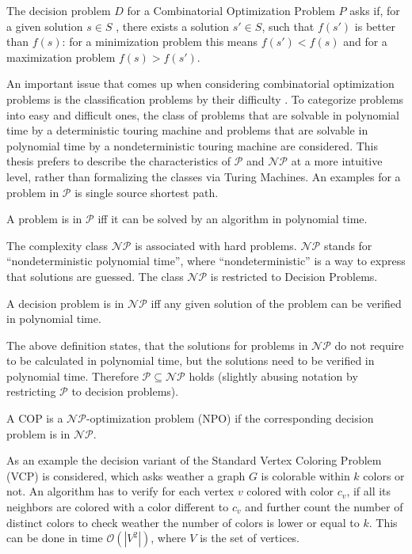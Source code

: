 \begin{definition}
The decision problem $D$ for a Combinatorial Optimization Problem $P$ asks if, for a given solution $s \in S$ , there exists a solution $s' \in S$, such that $f(s')$ is better than $f(s)$: for a minimization problem this means $f(s') < f(s)$ and for a maximization problem $f(s) > f (s')$.
\end{definition}
An important issue that comes up when considering combinatorial optimization problems is the classification problems by their difficulty . To categorize problems into easy and difficult ones, the class of problems that are solvable in polynomial time by a deterministic touring machine and problems that are solvable in polynomial time by a nondeterministic touring machine are considered. This thesis prefers to describe the characteristics of $\mathcal{P}$ and $\mathcal{NP}$ at a more intuitive level, rather than formalizing the classes via Turing Machines. An examples for a problem in $\mathcal{P}$ is single source shortest path.
\begin{definition}
A problem is in $\mathcal{P}$ iff it can be solved by an algorithm in polynomial time.
\end{definition}
The complexity class $\mathcal{NP}$ is associated with hard problems. $\mathcal{NP}$ stands for ``nondeterministic polynomial time'', where ``nondeterministic'' is a way to express that solutions are guessed. The class $\mathcal{NP}$ is restricted to Decision Problems.
\begin{definition}
A decision problem is in $\mathcal{NP}$ iff any given solution of the problem can be verified in polynomial time.
\end{definition}
The above definition states, that the solutions for problems in $\mathcal{NP}$ do not require to be calculated in polynomial time, but the solutions need to be verified in polynomial time. Therefore $\mathcal{P} \subseteq \mathcal{NP}$ holds (slightly abusing notation by restricting $\mathcal{P}$ to decision problems)\cite{neumann-10}.
\begin{definition}
A COP is a $\mathcal{NP}$-optimization problem (NPO) if the corresponding decision problem is in $\mathcal{NP}$.
\end{definition}
As an example the decision variant of the Standard Vertex Coloring Problem (VCP) is considered, which asks weather a graph $G$ is colorable within $k$ colors or not. An algorithm has to verify for each vertex $v$ colored with color $c_v$, if all its neighbors are colored with a color different to $c_v$ and further count the number of distinct colors to check weather the number of colors is lower or equal to $k$. This can be done in time  $\mathcal O(\left\vert{V^2}\right\vert)$, where $V$ is the set of vertices.\\
